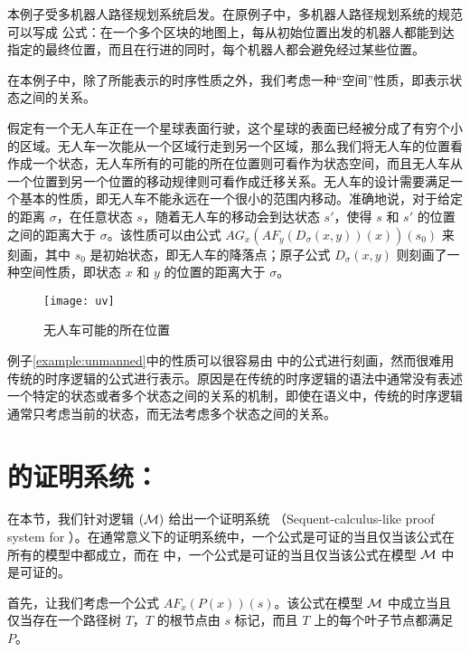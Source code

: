 \begin{example}\label{example:unmanned}
	本例子受多机器人路径规划系统\cite{Craig89,PartoviL14}启发。在原例子中，多机器人路径规划系统的规范可以写成 \CTL{} 公式：在一个多个区块的地图上，每从初始位置出发的机器人都能到达指定的最终位置，而且在行进的同时，每个机器人都会避免经过某些位置。
	
	在本例子中，除了\CTL{}所能表示的时序性质之外，我们考虑一种“空间”性质，即表示状态之间的关系。
	
	假定有一个无人车正在一个星球表面行驶，这个星球的表面已经被分成了有穷个小的区域。无人车一次能从一个区域行走到另一个区域，那么我们将无人车的位置看作成一个状态，无人车所有的可能的所在位置则可看作为状态空间，而且无人车从一个位置到另一个位置的移动规律则可看作成迁移关系。无人车的设计需要满足一个基本的性质，即无人车不能永远在一个很小的范围内移动。准确地说，对于给定的距离 $\sigma$，在任意状态 $s$，随着无人车的移动会到达状态 $s'$，使得 $s$ 和 $s'$ 的位置之间的距离大于 $\sigma$。该性质可以由公式 $AG_x(AF_y(D_\sigma(x,y))(x))(s_0)$ 来刻画，其中 $s_0$ 是初始状态，即无人车的降落点；原子公式 $D_\sigma(x,y)$ 则刻画了一种空间性质，即状态 $x$ 和 $y$ 的位置的距离大于 $\sigma$。
	
	\begin{figure}[h]
		\centering
		\texttt{[image: uv]}
		\caption{无人车可能的所在位置}\label{fig:uv}
	\end{figure}
	
\end{example}

例子\ref{example:unmanned}中的性质可以很容易由 \CTLP{} 中的公式进行刻画，然而很难用传统的时序逻辑的公式进行表示。原因是在传统的时序逻辑的语法中通常没有表述一个特定的状态或者多个状态之间的关系的机制，即使在语义中，传统的时序逻辑通常只考虑当前的状态，而无法考虑多个状态之间的关系。

\section{\CTLP{}的证明系统：\SCTL{}}\label{sec:sctl}
在本节，我们针对逻辑 \CTLP$(\cal M)$ 给出一个证明系统 \sctlm{} （Sequent-calculus-like proof system for \CTLP{}）。在通常意义下的证明系统中，一个公式是可证的当且仅当该公式在所有的模型中都成立，而在 \sctlm{} 中，一个公式是可证的当且仅当该公式在模型 $\cal M$ 中是可证的。

首先，让我们考虑一个\ctlpm{}公式 $AF_x(P(x))(s)$。该公式在模型 $\cal M$ 中成立当且仅当存在一个路径树 $T$，$T$ 的根节点由 $s$ 标记，而且 $T$ 上的每个叶子节点都满足 $P$。

